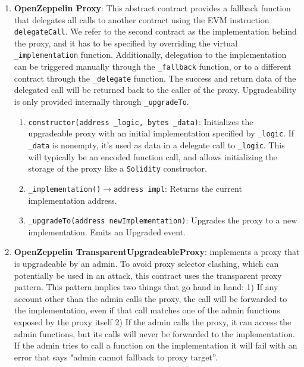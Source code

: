 \begin{enumerate}
\item\textbf{OpenZeppelin Proxy}: This abstract contract provides a fallback function that delegates all calls to another contract using the EVM instruction \verb|delegateCall|. We refer to the second contract as the implementation behind the proxy, and it has to be specified by overriding the virtual \verb|_implementation| function. Additionally, delegation to the implementation can be triggered manually through the \verb|_fallback| function, or to a different contract through the \verb|_delegate| function. The success and return data of the delegated call will be returned back to the caller of the proxy. Upgradeability is only provided internally through \verb|_upgradeTo|.
	\begin{enumerate}
	\item\verb|constructor(address _logic, bytes _data)|: Initializes the upgradeable proxy with an initial implementation specified by \verb|_logic|. If \verb|_data| is nonempty, it’s used as data in a delegate call to \verb|_logic|. This will typically be an encoded function call, and allows initializing the storage of the proxy like a \verb|Solidity| constructor.
	\item\verb|_implementation()|$\rightarrow$\verb|address impl|: Returns the current implementation address.
	\item\verb|_upgradeTo(address newImplementation)|: Upgrades the proxy to a new implementation. Emits an Upgraded event.
	\end{enumerate}

\item\textbf{OpenZeppelin TransparentUpgradeableProxy}: implements a proxy that is upgradeable by an admin. To avoid proxy selector clashing, which can potentially be used in an attack, this contract uses the transparent proxy pattern. This pattern implies two things that go hand in hand: 1) If any account other than the admin calls the proxy, the call will be forwarded to the implementation, even if that call matches one of the admin functions exposed by the proxy itself 2) If the admin calls the proxy, it can access the admin functions, but its calls will never be forwarded to the implementation. If the admin tries to call a function on the implementation it will fail with an error that says "admin cannot fallback to proxy target”.\\


\end{enumerate}
